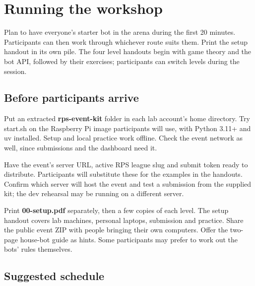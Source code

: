 \documentclass[11pt]{article}
\begin{document}
\thispagestyle{plain}

\section*{Running the workshop}

\begin{context}
Plan to have everyone's starter bot in the arena during the first 20 minutes. Participants can then work through whichever route suits them. Print the setup handout in its own pile. The four level handouts begin with game theory and the bot API, followed by their exercises; participants can switch levels during the session.

\end{context}

\subsection*{Before participants arrive}

Put an extracted \textbf{rps-event-kit} folder in each lab account's home directory. Try start.sh on the Raspberry Pi image participants will use, with Python 3.11+ and uv installed. Setup and local practice work offline. Check the event network as well, since submissions and the dashboard need it.


Have the event's server URL, active RPS league slug and submit token ready to distribute. Participants will substitute these for the examples in the handouts. Confirm which server will host the event and test a submission from the supplied kit; the dev rehearsal may be running on a different server.


Print \textbf{00-setup.pdf} separately, then a few copies of each level. The setup handout covers lab machines, personal laptops, submission and practice. Share the public event ZIP with people bringing their own computers. Offer the two-page house-bot guide as hints. Some participants may prefer to work out the bots' rules themselves.


\subsection*{Suggested schedule}
\end{document}
